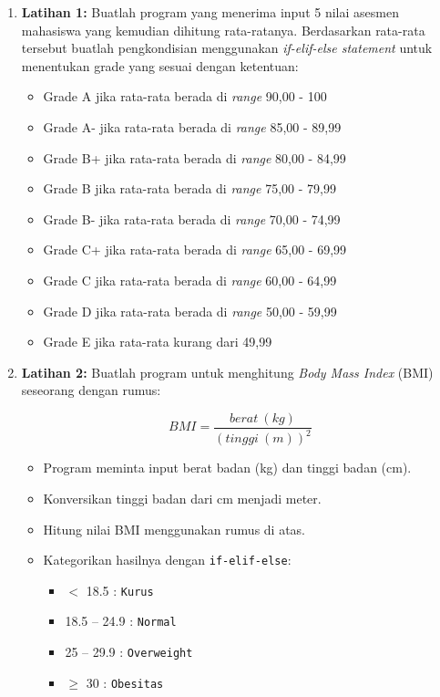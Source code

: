 \begin{enumerate}
\item \textbf{Latihan 1:} Buatlah program yang menerima input 5 nilai asesmen mahasiswa yang kemudian dihitung rata-ratanya. Berdasarkan rata-rata tersebut buatlah pengkondisian menggunakan \textit{if-elif-else statement} untuk menentukan grade yang sesuai dengan ketentuan:
\begin{itemize}
    \item Grade A jika rata-rata berada di \textit{range} 90,00 - 100
    \item Grade A- jika rata-rata berada di \textit{range} 85,00 - 89,99
    \item Grade B+ jika rata-rata berada di \textit{range} 80,00 - 84,99
    \item Grade B jika rata-rata berada di \textit{range} 75,00 - 79,99
    \item Grade B- jika rata-rata berada di \textit{range} 70,00 - 74,99
    \item Grade C+ jika rata-rata berada di \textit{range} 65,00 - 69,99
    \item Grade C jika rata-rata berada di \textit{range} 60,00 - 64,99
    \item Grade D jika rata-rata berada di \textit{range} 50,00 - 59,99
    \item Grade E jika rata-rata kurang dari 49,99
\end{itemize}

\item \textbf{Latihan 2:} Buatlah program untuk menghitung \textit{Body Mass Index} (BMI) seseorang dengan rumus:

\[
BMI = \frac{berat \ (kg)}{(tinggi \ (m))^2}
\]

\begin{itemize}
    \item Program meminta input berat badan (kg) dan tinggi badan (cm).
    \item Konversikan tinggi badan dari cm menjadi meter.
    \item Hitung nilai BMI menggunakan rumus di atas.
    \item Kategorikan hasilnya dengan \texttt{if-elif-else}:
    \begin{itemize}
        \item $<$ 18.5 : \texttt{Kurus}
        \item 18.5 -- 24.9 : \texttt{Normal}
        \item 25 -- 29.9 : \texttt{Overweight}
        \item $\geq$ 30 : \texttt{Obesitas}
    \end{itemize}
\end{itemize}


\end{enumerate}
